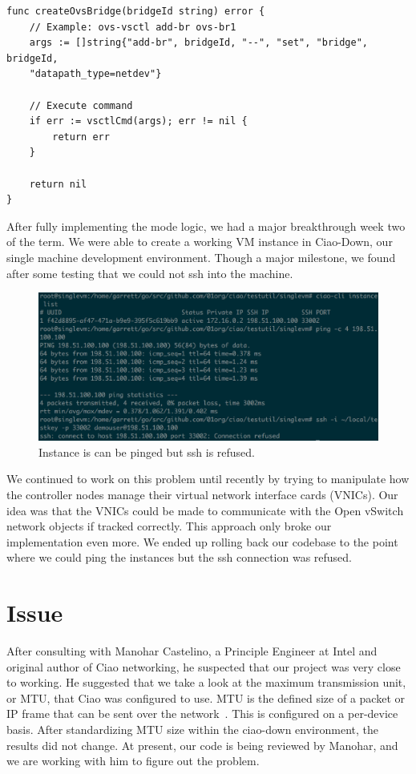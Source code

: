 \documentclass[10pt,onecolumn,journal,draftclsnofoot]{IEEEtran}
\begin{document}
\begin{lstlisting}[caption={The \texttt{createOvsBridge} function takes a string
\texttt{bridgeId}, builds a command, and calls the \texttt{vsctlCmd()
function}}]
func createOvsBridge(bridgeId string) error {
	// Example: ovs-vsctl add-br ovs-br1
	args := []string{"add-br", bridgeId, "--", "set", "bridge", bridgeId, 
	"datapath_type=netdev"}

	// Execute command
	if err := vsctlCmd(args); err != nil {
		return err
	}

	return nil
}
\end{lstlisting}

After fully implementing the mode logic, we had a major breakthrough week two
of the term. We were able to create a working VM instance in Ciao-Down,
our single machine development environment. Though a major milestone, we found
after some testing that we could not ssh into the machine.

\begin{figure}[H]
\caption{Instance is can be pinged but ssh is refused.}
\includegraphics[scale=0.5]{./ssh-refused.eps}
\end{figure}

We continued to work on this problem until recently by trying to manipulate how
the controller nodes manage their virtual network interface cards (VNICs). Our
idea was that the VNICs could be made to communicate with the Open vSwitch
network objects if tracked correctly. This approach only broke our
implementation even more. We ended up rolling back our codebase to the point
where we could ping the instances but the ssh connection was refused.

\section{Issue}
After consulting with Manohar Castelino, a Principle Engineer at Intel and
original author of Ciao networking, he suspected that our project was very close
to working.  He suggested that we take a look at the maximum transmission unit,
or MTU, that Ciao was configured to use. MTU is the defined size of a packet or
IP frame that can be sent over the network~\cite{MTU}. This is configured on a
per-device basis. After standardizing MTU size within the ciao-down environment,
the results did not change. At present, our code is being reviewed by Manohar,
and we are working with him to figure out the problem.
\end{document}

